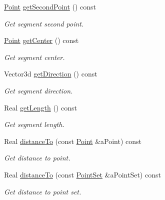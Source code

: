 \begin{DoxyCompactItemize}
\hyperlink{classostk_1_1math_1_1geom_1_1d3_1_1objects_1_1_point}{Point} \hyperlink{classostk_1_1math_1_1geom_1_1d3_1_1objects_1_1_segment_a194f50a9505400681ba0bb15ae999465}{get\+Second\+Point} () const
\begin{DoxyCompactList}\small\item\em Get segment second point. \end{DoxyCompactList}\item 
\hyperlink{classostk_1_1math_1_1geom_1_1d3_1_1objects_1_1_point}{Point} \hyperlink{classostk_1_1math_1_1geom_1_1d3_1_1objects_1_1_segment_a7d37a80e12053ec307dfd8e4d3973843}{get\+Center} () const
\begin{DoxyCompactList}\small\item\em Get segment center. \end{DoxyCompactList}\item 
Vector3d \hyperlink{classostk_1_1math_1_1geom_1_1d3_1_1objects_1_1_segment_ab708b9d0ab53ef8b15974244810a732f}{get\+Direction} () const
\begin{DoxyCompactList}\small\item\em Get segment direction. \end{DoxyCompactList}\item 
Real \hyperlink{classostk_1_1math_1_1geom_1_1d3_1_1objects_1_1_segment_a0f40747b4f8da2ef00b57ff0e4445968}{get\+Length} () const
\begin{DoxyCompactList}\small\item\em Get segment length. \end{DoxyCompactList}\item 
Real \hyperlink{classostk_1_1math_1_1geom_1_1d3_1_1objects_1_1_segment_a403915ebd6906ff29c93728b5bb8bbba}{distance\+To} (const \hyperlink{classostk_1_1math_1_1geom_1_1d3_1_1objects_1_1_point}{Point} \&a\+Point) const
\begin{DoxyCompactList}\small\item\em Get distance to point. \end{DoxyCompactList}\item 
Real \hyperlink{classostk_1_1math_1_1geom_1_1d3_1_1objects_1_1_segment_ade8414dc47f495917f43012f78e30017}{distance\+To} (const \hyperlink{classostk_1_1math_1_1geom_1_1d3_1_1objects_1_1_point_set}{Point\+Set} \&a\+Point\+Set) const
\begin{DoxyCompactList}\small\item\em Get distance to point set. \end{DoxyCompactList}\item 

\end{DoxyCompactItemize}
